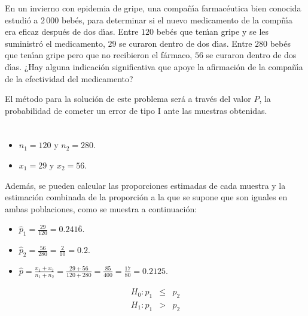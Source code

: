\begin{enunciado}
 En un invierno con epidemia de gripe, una compa\~n\'{\i}a farmac\'eutica
 bien conocida estudi\'o a $2\,000$ beb\'es,
 para determinar si el nuevo medicamento de la comp\~n\'{\i}a era eficaz despu\'es
 de dos d\'{\i}as.
 Entre $120$ beb\'es que ten\'{\i}an gripe y se les suministr\'o el medicamento,
 $29$ se curaron dentro de dos d\'{\i}as.
 Entre $280$ beb\'es que ten\'{\i}an gripe pero que no recibieron el f\'armaco,
 $56$ se curaron dentro de dos d\'{\i}as.
 ¿Hay alguna indicaci\'on significativa que apoye la afirmaci\'on
 de la compa\~n\'{\i}a de la efectividad del medicamento?
\end{enunciado}

\vspace{2cm}
\begin{solucion}
 El m\'etodo para la soluci\'on de este problema ser\'a a trav\'es del valor $P$,
 la probabilidad de cometer un error de tipo I ante las muestras obtenidas.
 \begin{datos}
  $\phantom{0}$
  \begin{itemize}
   \item $n_1 = 120$ y $n_2 = 280$.
   \item $x_1 = 29$ y $x_2 = 56$.
  \end{itemize}
  Adem\'as, se pueden calcular las proporciones estimadas de cada muestra
  y la estimaci\'on combinada de la proporci\'on a la que se supone que son iguales
  en ambas poblaciones, como se muestra a continuaci\'on:
  \begin{itemize}
   \item $\widehat{p}_1 = \frac{29}{120} = 0.241\bar{6}$.
   \item $\widehat{p}_2 = \frac{56}{280} = \frac{2}{10} = 0.2$.
   \item $\widehat{p} = \frac{x_1+x_2}{n_1+n_2} = \frac{29+56}{120+280}
   = \frac{85}{400} = \frac{17}{80} = 0.2125$.
  \end{itemize}
 \end{datos}

 \begin{hipotesis}
  \begin{eqnarray*}
   H_0: p_1 & \leq & p_2 \\
   H_1: p_1 &  >   & p_2
  \end{eqnarray*}
 \end{hipotesis}


\end{solucion}
